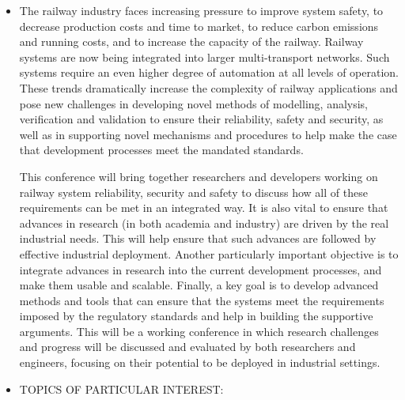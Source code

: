 \documentclass[prodmode,acmtecs]{acmsmall} %
\begin{document}
\begin{itemize}\item  The railway industry faces increasing pressure to improve system safety, to decrease production costs and time to market, to reduce carbon emissions and running costs, and to increase the capacity of the railway. Railway systems are now being integrated into larger multi-transport networks. Such systems require an even higher degree of automation at all levels of operation. These trends dramatically increase the complexity of railway applications and pose new challenges in developing novel methods of modelling, analysis, verification and validation to ensure their reliability, safety and security, as well as in supporting novel mechanisms and procedures to help make the case that development processes meet the mandated standards. 
 
  This conference will bring together researchers and developers working on railway system reliability, security and safety to discuss how all of these requirements can be met in an integrated way. It is also vital to ensure that advances in research (in both academia and industry) are driven by the real industrial needs. This will help ensure that such advances are followed by effective industrial deployment. Another particularly important objective is to integrate advances in research into the current development processes, and make them usable and scalable. Finally, a key goal is to develop advanced methods and tools that can ensure that the systems meet the requirements imposed by the regulatory standards and help in building the supportive arguments. This will be a working conference in which research challenges and progress will be discussed and evaluated by both researchers and engineers, focusing on their potential to be deployed in industrial settings. 
 
\item  TOPICS OF PARTICULAR INTEREST: 
 

\end{itemize}
\end{document}
